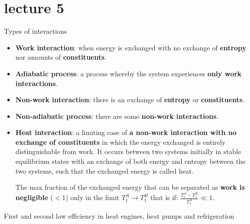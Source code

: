 \section{lecture 5}
\begin{defn}
    Types of interactions

    \begin{itemize}
        \item \textbf{Work interaction}: when energy is exchanged with no exchange of 
        \textbf{entropy} nor amounts of \textbf{constituents}. 
        \item \textbf{Adiabatic process}: a process whereby the system experiences \textbf{only work interactions}.
        \item \textbf{Non-work interaction}: there is an exchange of \textbf{entropy} or \textbf{constituents}. 
        \item \textbf{Non-adiabatic process}: there are some \textbf{non-work interactions}.
        \item \textbf{Heat interaction}: a limiting case of \textbf{a non-work interaction with no exchange of constituents} 
        in which the energy exchanged is entirely distinguishable from work. It occurs between two systems initially in 
        stable equilibrium states with an exchange of both energy and entropy between the two systems, 
        such that the exchanged energy is called heat.

        The max fraction of the exchanged energy that can be separated as \textbf{work is negligible} (\(< 1\)) only 
        in the limit \( T_1^A \rightarrow T_1^B \) that is if:
    \(
    \frac{T_1^A - T_1^B}{T_1^A} \ll 1
    \).
    \end{itemize}
\end{defn}
\begin{example}
    First and second law 
    efficiency
     in
     heat engines,
     heat pumps and
    refrigeration
\end{example}

















\ifx\allfiles\undefined

\fi
